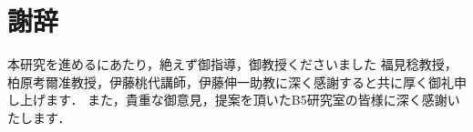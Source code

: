 \newpage
{}
\chapter*{謝辞}
本研究を進めるにあたり，絶えず御指導，御教授くださいました
福見稔教授，柏原考爾准教授，伊藤桃代講師，伊藤伸一助教に深く感謝すると共に厚く御礼申し上げます．
また，貴重な御意見，提案を頂いたB5研究室の皆様に深く感謝いたします．
